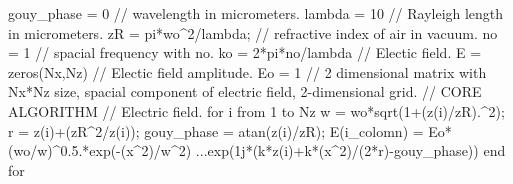 \documentclass[a4paper]{article}
\begin{document}
{		gouy\_phase = 0 \newline		
		\textcolor{OliveGreen}{// wavelength in micrometers.}\newline
		lambda = 10\newline
		\textcolor{OliveGreen}{// Rayleigh length in micrometers.}\newline
		zR = pi*wo\string^2/lambda;\newline
		\textcolor{OliveGreen}{// refractive index of air in vacuum.}\newline
		no = 1\newline
		\textcolor{OliveGreen}{// spacial frequency with no.}\newline
		ko = 2*pi*no/lambda\newline
		\textcolor{OliveGreen}{// Electic field.}\newline
		E = zeros(Nx,Nz)\newline
		\textcolor{OliveGreen}{// Electic field amplitude.}\newline
		Eo = 1\newline
		\textcolor{OliveGreen}{// 2 dimensional matrix with Nx*Nz size, spacial component of electric field, 2-dimensional grid.}\newpage
		\noindent\textcolor{OliveGreen}{// CORE ALGORITHM}\newline\newline
		\textcolor{OliveGreen}{// Electric field.}\newline
		for i from 1 to Nz \newline
		\indent w = wo*sqrt(1+(z(i)/zR).\string^2);\newline
		\indent r = z(i)+(zR\string^2/z(i));\newline
		\indent gouy\_phase = atan(z(i)/zR);\newline
		\indent E(i\_colomn) = Eo*(wo/w)\string^0.5.*exp(-(x\string^2)/w\string^2) ...\newline \indent\indent\indent\indent\indent\indent\indent\indent*exp(1j*(k*z(i)+k*(x\string^2)/(2*r)-gouy\_phase))\newline
		end for\newline\newline	
	}\newpage
	
\end{document}

